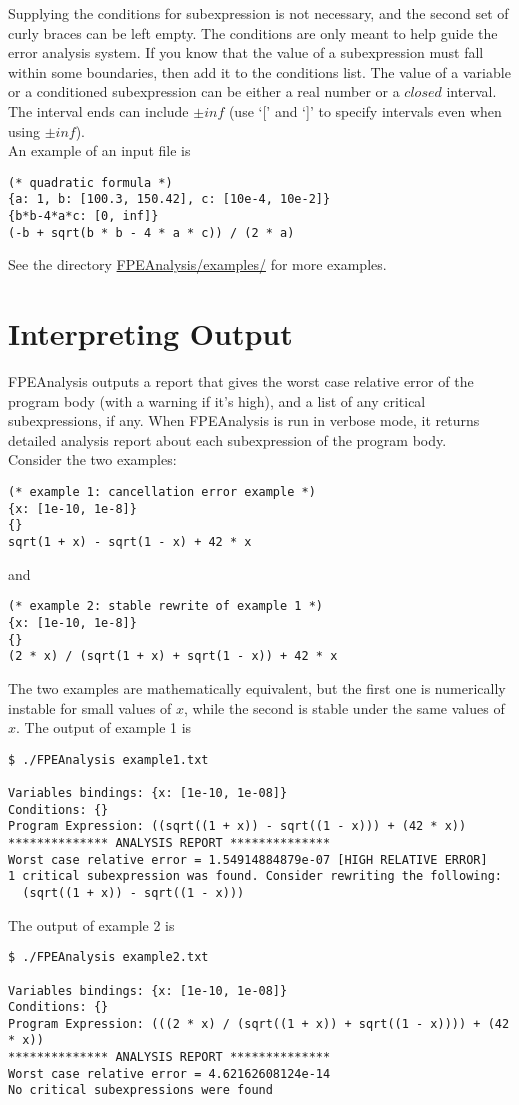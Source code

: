 \documentclass{article}
\begin{document}
Supplying the conditions for subexpression is not necessary, and the second set of curly braces can be left empty. The conditions are only meant to help guide the error analysis system. If you know that the value of a subexpression must fall within some boundaries, then add it to the conditions list. The value of a variable or a conditioned subexpression can be either a real number or a $closed$ interval. The interval ends can include $\pm inf$ (use `[' and `]' to specify intervals even when using $\pm inf$).\\

An example of an input file is  
\begin{verbatim}
(* quadratic formula *)
{a: 1, b: [100.3, 150.42], c: [10e-4, 10e-2]}
{b*b-4*a*c: [0, inf]}
(-b + sqrt(b * b - 4 * a * c)) / (2 * a)
\end{verbatim}

\noindent See the directory \underline{FPEAnalysis/examples/} for more examples.

\clearpage
\section{Interpreting Output}
FPEAnalysis outputs a report that gives the worst case relative error of the program body (with a warning if it's high), and a list of any critical subexpressions, if any. When FPEAnalysis is run in verbose mode, it returns detailed analysis report about each subexpression of the program body.\\

Consider the two examples:
\begin{verbatim}
(* example 1: cancellation error example *)
{x: [1e-10, 1e-8]}
{}
sqrt(1 + x) - sqrt(1 - x) + 42 * x
\end{verbatim}
and 
\begin{verbatim}
(* example 2: stable rewrite of example 1 *)
{x: [1e-10, 1e-8]}
{}
(2 * x) / (sqrt(1 + x) + sqrt(1 - x)) + 42 * x
\end{verbatim}

The two examples are mathematically equivalent, but the first one is numerically instable for small values of $x$, while the second is stable under the same values of $x$. The output of example 1 is 
\begin{verbatim}
$ ./FPEAnalysis example1.txt

Variables bindings: {x: [1e-10, 1e-08]}
Conditions: {}
Program Expression: ((sqrt((1 + x)) - sqrt((1 - x))) + (42 * x))
************** ANALYSIS REPORT **************
Worst case relative error = 1.54914884879e-07 [HIGH RELATIVE ERROR]
1 critical subexpression was found. Consider rewriting the following:
  (sqrt((1 + x)) - sqrt((1 - x)))
\end{verbatim}

\noindent The output of example 2 is 
\begin{verbatim}
$ ./FPEAnalysis example2.txt

Variables bindings: {x: [1e-10, 1e-08]}
Conditions: {}
Program Expression: (((2 * x) / (sqrt((1 + x)) + sqrt((1 - x)))) + (42 * x))
************** ANALYSIS REPORT **************
Worst case relative error = 4.62162608124e-14
No critical subexpressions were found
\end{verbatim}
 
\end{document}
